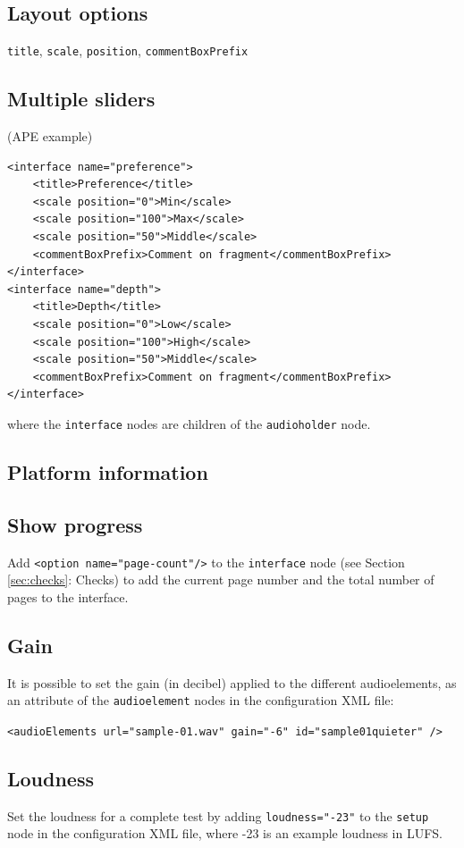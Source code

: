 \documentclass[11pt, oneside]{article}   	%
\begin{document}
	\subsection{Layout options}
		\texttt{title}, \texttt{scale}, \texttt{position}, \texttt{commentBoxPrefix}

	\subsection{Multiple sliders}
		(APE example)

		\begin{lstlisting}
<interface name="preference">
	<title>Preference</title>
	<scale position="0">Min</scale>
	<scale position="100">Max</scale>
	<scale position="50">Middle</scale>
	<commentBoxPrefix>Comment on fragment</commentBoxPrefix>
</interface>
<interface name="depth">
	<title>Depth</title>
	<scale position="0">Low</scale>
	<scale position="100">High</scale>
	<scale position="50">Middle</scale>
	<commentBoxPrefix>Comment on fragment</commentBoxPrefix>
</interface>
		\end{lstlisting}
		where the \texttt{interface} nodes are children of the \texttt{audioholder} node. 

	\subsection{Platform information}

	\subsection{Show progress}
		Add \texttt{<option name="page-count"/>} to the \texttt{interface} node (see Section \ref{sec:checks}: Checks) to add the current page number and the total number of pages to the interface. 

	\subsection{Gain}
		It is possible to set the gain (in decibel) applied to the different audioelements, as an attribute of the \texttt{audioelement} nodes in the configuration XML file: 

		\texttt{<audioElements url="sample-01.wav" gain="-6" id="sample01quieter" />}

	\subsection{Loudness}
		Set the loudness for a complete test by adding \texttt{loudness="-23"} to the \texttt{setup} node in the configuration XML file, where -23 is an example loudness in LUFS. 
\end{document}
